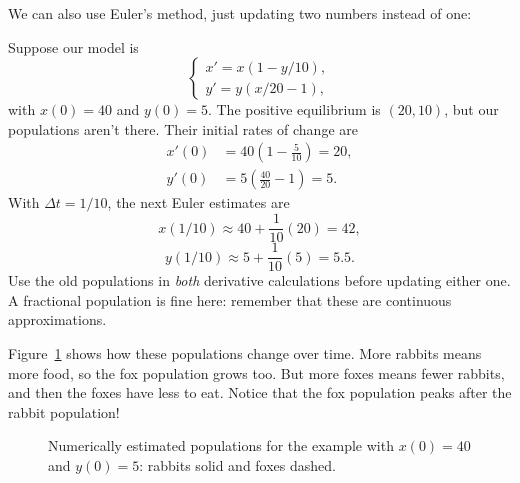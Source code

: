 We can also use Euler's method, just updating two numbers instead of one:
\begin{exampleblock}[breakable]
Suppose our model is
$$
\begin{cases}
x'=x(1-y/10),\\
y'=y(x/20-1),
\end{cases}
$$
with $x(0)=40$ and $y(0)=5$. The positive equilibrium is $(20,10)$,
but our populations aren't there. Their initial rates of change are
\begin{align*}
x'(0)&=40\left(1-\frac5{10}\right)=20,\\
y'(0)&=5\left(\frac{40}{20}-1\right)=5.
\end{align*}
With $\Delta t=1/10$, the next Euler estimates are
$$x(1/10)\approx40+\frac1{10}(20)=42,$$
$$y(1/10)\approx5+\frac1{10}(5)=5.5.$$
Use the old populations in \textit{both} derivative calculations before
updating either one. A fractional population is fine here: remember that
these are continuous approximations.

Figure~\ref{fig:predator-prey-populations} shows how these populations
change over time. More rabbits means more food, so the fox population
grows too. But more foxes means fewer rabbits, and then the foxes have
less to eat. Notice that the fox population peaks after the rabbit
population!
\begin{figure}[H]
\centering
{}
\caption{Numerically estimated populations for the example with
$x(0)=40$ and $y(0)=5$: rabbits solid and foxes dashed.}
\label{fig:predator-prey-populations}
\end{figure}
\end{exampleblock}
